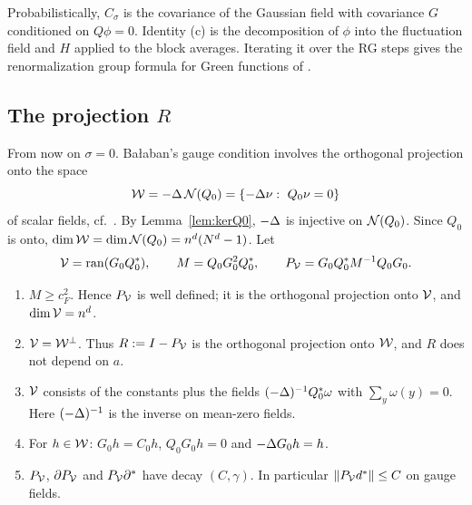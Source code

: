 \begin{remark}
Probabilistically, $C_\sigma$ is the covariance of the Gaussian field with covariance $G$ conditioned on $Q\phi=0$. Identity (c) is the decomposition of $\phi$ into the fluctuation field and $H$ applied to the block averages. Iterating it over the RG steps gives the renormalization group formula for Green functions of \cite[Sect.~2.5]{DST1}.
\end{remark}

\subsection{The projection \texorpdfstring{$R$}{R}}

From now on $\sigma=0$. Ba\l aban's gauge condition involves the orthogonal projection onto the space
\[
\cW=-\Lap\,\cN(Q_0)=\{-\Lap\nu:\ Q_0\nu=0\}
\]
of scalar fields, cf.\ \cite[(1.38)--(1.44)]{BalPropI}. By Lemma~\ref{lem:kerQ0}, $-\Delta$ is injective on $\mathcal N(Q_0)$. Since $Q_0$ is onto, $\dim\mathcal W=\dim\mathcal N(Q_0)=n^d(N^d-1)$. Let
\[
\mathcal V=\operatorname{ran}(G_0Q_0^*),\qquad M=Q_0G_0^2Q_0^*,\qquad P_\mathcal V=G_0Q_0^*M^{-1}Q_0G_0 .
\]

\begin{proposition}\label{prop:R}
\begin{enumerate}[label=(\alph*)]
\item $M\ge c_F^2$. Hence $P_\mathcal V$ is well defined; it is the orthogonal projection onto $\mathcal V$, and $\dim\mathcal V=n^d$.
\item $\mathcal V=\mathcal W^\perp$. Thus $R:=I-P_\mathcal V$ is the orthogonal projection onto $\mathcal W$, and $R$ does not depend on $a$.
\item $\mathcal V$ consists of the constants plus the fields $(-\Delta)^{-1}Q_0^*\omega$ with $\sum_y\omega(y)=0$. Here $(-\Delta)^{-1}$ is the inverse on mean-zero fields.
\item For $h\in\mathcal W$: $G_0h=C_0h$, $Q_0G_0h=0$ and $-\Delta G_0h=h$.
\item $P_\mathcal V$, $\partial P_\mathcal V$ and $P_\mathcal V\partial^*$ have decay $(C,\gamma)$. In particular $\|P_\mathcal V d^*\|\le C$ on gauge fields.
\end{enumerate}
\end{proposition}

